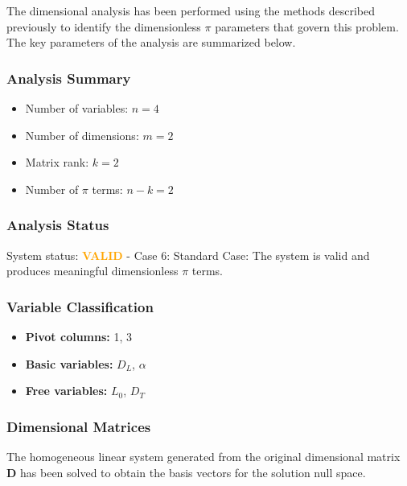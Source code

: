 The dimensional analysis has been performed using the methods described previously to identify the dimensionless $\pi$ parameters that govern this problem. The key parameters of the analysis are summarized below.

\subsubsection*{Analysis Summary}
\begin{itemize}
\item Number of variables: $n = 4$
\item Number of dimensions: $m = 2$
\item Matrix rank: $k = 2$
\item Number of $\pi$ terms: $n - k = 2$
\end{itemize}

\subsubsection*{Analysis Status}
System status: \textcolor{orange}{\textbf{VALID}} - Case 6: Standard Case: The system is valid and produces meaningful dimensionless $\pi$ terms.

\subsubsection*{Variable Classification}
\begin{itemize}
\item \textbf{Pivot columns:} 1, 3
\item \textbf{Basic variables:} $D_L$, $\alpha$
\item \textbf{Free variables:} $L_0$, $D_T$
\end{itemize}

\subsubsection*{Dimensional Matrices}
The homogeneous linear system generated from the original dimensional matrix $\mathbf{D}$ has been solved to obtain the basis vectors for the solution null space.

